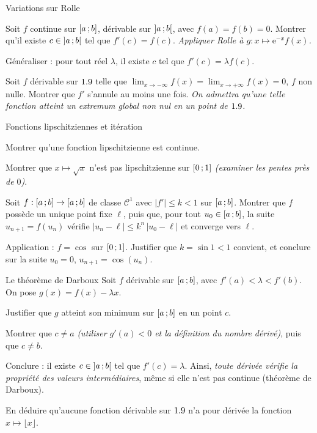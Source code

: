 \begin{exercice}[3]{Variations sur Rolle}
\begin{questions}
  \item Soit $f$ continue sur $\mathopen{[}a\,{;}\,b\mathclose{]}$, dérivable sur
    $\mathopen{]}a\,{;}\,b\mathclose{[}$, avec $f(a)=f(b)=0$. Montrer qu'il existe
    $c\in\mathopen{]}a\,{;}\,b\mathclose{[}$ tel que $f'(c)=f(c)$.
    \emph{Appliquer Rolle à $g:x\mapsto\mathrm{e}^{-x}f(x)$.}
  \item Généraliser : pour tout réel $\lambda$, il existe $c$ tel que
    $f'(c)=\lambda f(c)$.
  \item Soit $f$ dérivable sur $1.9$ telle que
    $\lim_{x\to-\infty}f(x)=\lim_{x\to+\infty}f(x)=0$, $f$ non nulle.
    Montrer que $f'$ s'annule au moins une fois.
    \emph{On admettra qu'une telle fonction atteint un extremum global non
    nul en un point de $1.9$.}
\end{questions}
\end{exercice}

\begin{exercice}[3]{Fonctions lipschitziennes et itération}
\begin{questions}
  \item Montrer qu'une fonction lipschitzienne est continue.
  \item Montrer que $x\mapsto\sqrt{x}$ n'est pas lipschitzienne sur
    $\mathopen{[}0\,{;}\,1\mathclose{]}$ \emph{(examiner les pentes près de $0$)}.
  \item Soit $f:\mathopen{[}a\,{;}\,b\mathclose{]}\to\mathopen{[}a\,{;}\,b\mathclose{]}$ de classe $\mathscr{C}^{1}$
    avec $|f'|\leq k<1$ sur $\mathopen{[}a\,{;}\,b\mathclose{]}$.
    Montrer que $f$ possède un unique point fixe $\ell$, puis que, pour tout
    $u_0\in\mathopen{[}a\,{;}\,b\mathclose{]}$, la suite $u_{n+1}=f(u_n)$ vérifie
    $|u_n-\ell|\leq k^{n}\,|u_0-\ell|$ et converge vers $\ell$.
  \item Application : $f=\cos$ sur $\mathopen{[}0\,{;}\,1\mathclose{]}$. Justifier que
    $k=\sin1<1$ convient, et conclure sur la suite $u_0=0$,
    $u_{n+1}=\cos(u_n)$.
\end{questions}
\end{exercice}

\begin{exercice}[3]{Le théorème de Darboux}
Soit $f$ dérivable sur $\mathopen{[}a\,{;}\,b\mathclose{]}$, avec $f'(a)<\lambda<f'(b)$. On pose
$g(x)=f(x)-\lambda x$.
\begin{questions}
  \item Justifier que $g$ atteint son minimum sur $\mathopen{[}a\,{;}\,b\mathclose{]}$ en un
    point $c$.
  \item Montrer que $c\neq a$ \emph{(utiliser $g'(a)<0$ et la définition du
    nombre dérivé)}, puis que $c\neq b$.
  \item Conclure : il existe $c\in\mathopen{]}a\,{;}\,b\mathclose{[}$ tel que $f'(c)=\lambda$.
    Ainsi, \emph{toute dérivée vérifie la propriété des valeurs
    intermédiaires}, même si elle n'est pas continue (théorème de Darboux).
  \item En déduire qu'aucune fonction dérivable sur $1.9$ n'a pour dérivée
    la fonction $x\mapsto\lfloor x\rfloor$.
\end{questions}
\end{exercice}

